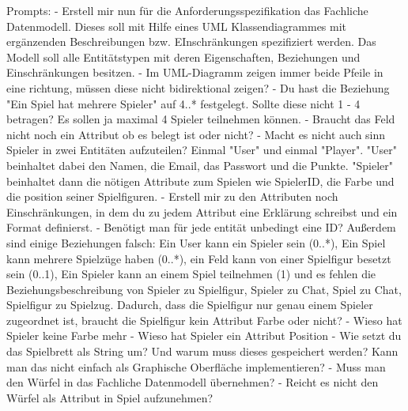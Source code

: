     Prompts:
        - Erstell mir nun für die Anforderungsspezifikation das Fachliche Datenmodell. Dieses soll mit Hilfe eines UML Klassendiagrammes mit ergänzenden Beschreibungen bzw. EInschränkungen spezifiziert werden. Das Modell soll alle Entitätstypen mit deren Eigenschaften, Beziehungen und Einschränkungen besitzen.
        - Im UML-Diagramm zeigen immer beide Pfeile in eine richtung, müssen diese nicht bidirektional zeigen?
        - Du hast die Beziehung "Ein Spiel hat mehrere Spieler" auf 4..* festgelegt. Sollte diese nicht 1 - 4 betragen? Es sollen ja maximal 4 Spieler teilnehmen können.
        - Braucht das Feld nicht noch ein Attribut ob es belegt ist oder nicht?
        - Macht es nicht auch sinn Spieler in zwei Entitäten aufzuteilen? Einmal "User" und einmal "Player".  "User" beinhaltet dabei den Namen, die Email, das Passwort und die Punkte. "Spieler" beinhaltet dann die nötigen Attribute zum Spielen wie SpielerID, die Farbe und die position seiner Spielfiguren.
        - Erstell mir zu den Attributen noch Einschränkungen, in dem du zu jedem Attribut eine Erklärung schreibst und ein Format definierst.
        - Benötigt man für jede entität unbedingt eine ID? Außerdem sind einige Beziehungen falsch: Ein User kann ein Spieler sein (0..*), Ein Spiel kann mehrere Spielzüge haben (0..*), ein Feld kann von einer Spielfigur besetzt sein (0..1), Ein Spieler kann an einem Spiel teilnehmen (1) und es fehlen die Beziehungsbeschreibung von Spieler zu Spielfigur, Spieler zu Chat, Spiel zu Chat, Spielfigur zu Spielzug. Dadurch, dass die Spielfigur nur genau einem Spieler zugeordnet ist, braucht die Spielfigur kein Attribut Farbe oder nicht?
        - Wieso hat Spieler keine Farbe mehr
        - Wieso hat Spieler ein Attribut Position
        - Wie setzt du das Spielbrett als String um? Und warum muss dieses gespeichert werden? Kann man das nicht einfach als Graphische Oberfläche implementieren?
        - Muss man den Würfel in das Fachliche Datenmodell übernehmen? 
        - Reicht es nicht den Würfel als Attribut in Spiel aufzunehmen?
